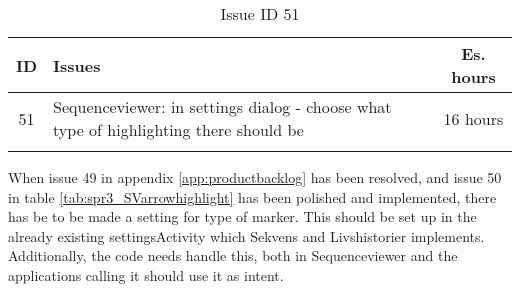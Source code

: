 \begin{longtable} { | c | p{12cm} | c | } 
\hline
	ID 	&	Issues	&		 Es. hours \\\hline
	51 	&	Sequenceviewer: in settings dialog - choose what type of highlighting there should be	&	16 hours \\\hline
\caption{Issue ID 51}
\label{tab:spr3_SVsettingsdialog}
\end{longtable}

When issue 49 in appendix \ref{app:productbacklog} has been resolved, and issue 50 in table \ref{tab:spr3_SVarrowhighlight} has been polished and implemented, there has be to be made a setting for type of marker. This should be set up in the already existing settingsActivity which Sekvens and Livshistorier implements. Additionally, the code needs handle this, both in Sequenceviewer and the applications calling it should use it as intent.